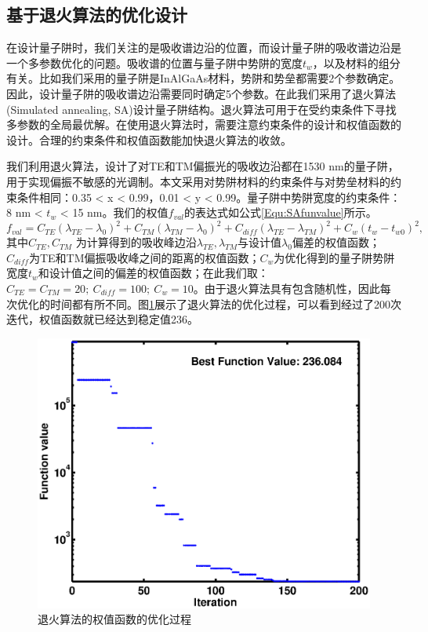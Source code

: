 \subsection{基于退火算法的优化设计}
在设计量子阱时，我们关注的是吸收谱边沿的位置，而设计量子阱的吸收谱边沿是一个多参数优化的问题。吸收谱的位置与量子阱中势阱的宽度$t_w$，以及材料的组分有关。比如我们采用的量子阱是InAlGaAs材料，势阱和势垒都需要2个参数确定。因此，设计量子阱的吸收谱边沿需要同时确定5个参数。在此我们采用了退火算法(Simulated annealing, SA)\cite{Kirkpatrick671}设计量子阱结构。退火算法可用于在受约束条件下寻找多参数的全局最优解。在使用退火算法时，需要注意约束条件的设计和权值函数的设计。合理的约束条件和权值函数能加快退火算法的收敛。

我们利用退火算法，设计了对TE和TM偏振光的吸收边沿都在1530 nm的量子阱，用于实现偏振不敏感的光调制。本文采用对势阱材料的约束条件与对势垒材料的约束条件相同：0.35 < x < 0.99，0.01 < y < 0.99。量子阱中势阱宽度的约束条件：8 nm < $t_w$ < 15 nm。我们的权值$f_{val}$的表达式如公式\ref{Equ:SAfunvalue}所示。
\begin{equation}
\label{Equ:SAfunvalue}
f_{val} = C_{TE}(\lambda_{TE}-\lambda_{0})^2 + C_{TM}(\lambda_{TM}-\lambda_{0})^2 + C_{diff}(\lambda_{TE}-\lambda_{TM})^2 + C_{w}(t_w-t_{w0})^2,
\end{equation}
其中$C_{TE}, C_{TM}$ 为计算得到的吸收峰边沿$\lambda_{TE}, \lambda_{TM}$与设计值$\lambda_{0}$偏差的权值函数； $C_{diff}$为TE和TM偏振吸收峰之间的距离的权值函数；$C_{w}$为优化得到的量子阱势阱宽度$t_w$和设计值之间的偏差的权值函数；在此我们取：$C_{TE} = C_{TM} = 20;~C_{diff} = 100;~C_{w} = 10$。由于退火算法具有包含随机性，因此每次优化的时间都有所不同。图\ref{fig_ch2_fast_annealing}展示了退火算法的优化过程，可以看到经过了200次迭代，权值函数就已经达到稳定值236。
\begin{figure}[htb]
	\centering
	\includegraphics[width=12cm]{./Pictures/fig_ch2_fast_annealing.eps}
	\caption{退火算法的权值函数的优化过程}
	\label{fig_ch2_fast_annealing}
\end{figure}
